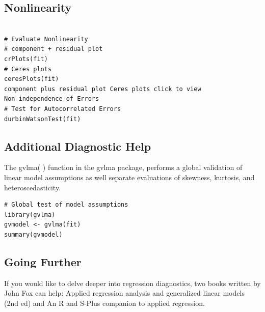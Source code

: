 \documentclass[residuals.tex]{subfiles}
\begin{document}
\subsection{Nonlinearity}
\begin{framed}
\begin{verbatim}	
	
# Evaluate Nonlinearity
# component + residual plot 
crPlots(fit)
# Ceres plots 
ceresPlots(fit)
component plus residual plot Ceres plots click to view
Non-independence of Errors
# Test for Autocorrelated Errors
durbinWatsonTest(fit)
\end{verbatim}
\end{framed}
\subsection{Additional Diagnostic Help}
The gvlma( ) function in the gvlma package, performs a global validation of linear model assumptions as well separate evaluations of skewness, kurtosis, and heteroscedasticity.
\begin{framed}
\begin{verbatim}
# Global test of model assumptions
library(gvlma)
gvmodel <- gvlma(fit) 
summary(gvmodel)
\end{verbatim}
\end{framed}
\subsection{Going Further}
If you would like to delve deeper into regression diagnostics, two books written by John Fox can help: Applied regression analysis and generalized linear models (2nd ed) and An R and S-Plus companion to applied regression.
\end{document}
